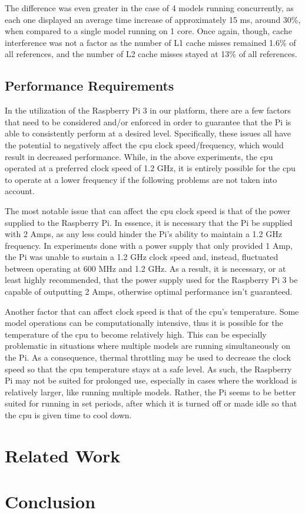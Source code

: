 \documentclass[10pt, conference]{IEEEtran}
\begin{document}
The difference was even greater in the case of 4 models running concurrently, as each one displayed 
an average time increase of approximately 15 ms, around 30\%, when compared to a single model 
running on 1 core. Once again, though, cache interference was not a factor as the number of L1 cache 
misses remained 1.6\% of all references, and the number of L2 cache misses stayed at 13\% of all 
references.

\subsection{Performance Requirements}
In the utilization of the Raspberry Pi 3 in our platform, there are a few factors that need to be 
considered and/or enforced in order to guarantee that the Pi is able to consistently perform at a 
desired level. Specifically, these issues all have the potential to negatively affect the cpu clock 
speed/frequency, which would result in decreased performance. While, in the above experiments, the cpu 
operated at a preferred clock speed of 1.2 GHz, it is entirely possible for the cpu to operate at a 
lower frequency if the following problems are not taken into account.

The most notable issue that can affect the cpu clock speed is that of the power supplied to the 
Raspberry Pi. In essence, it is necessary that the Pi be supplied with 2 Amps, as any less could 
hinder the Pi's ability to maintain a 1.2 GHz frequency. In experiments done with a power supply that 
only provided 1 Amp, the Pi was unable to sustain a 1.2 GHz clock speed and, instead, fluctuated 
between operating at 600 MHz and 1.2 GHz. As a result, it is necessary, or at least highly 
recommended, that the power supply used for the Raspberry Pi 3 be capable of outputting 2 Amps, 
otherwise optimal performance isn't guaranteed.

Another factor that can affect clock speed is that of the cpu's temperature. Some model operations can 
be computationally intensive, thus it is possible for the temperature of the cpu to become relatively 
high. This can be especially problematic in situations where multiple models are running 
simultaneously on the Pi. As a consequence, thermal throttling may be used to decrease the clock 
speed so that the cpu temperature stays at a safe level. As such, the Raspberry Pi may not be suited 
for prolonged use, especially in cases where the workload is relatively larger, like running multiple 
models. Rather, the Pi seems to be better suited for running in set periods, after which it is turned 
off or made idle so that the cpu is given time to cool down.
\section{Related Work}
\cite{Bojarski2016}

\section{Conclusion}



\end{document}
